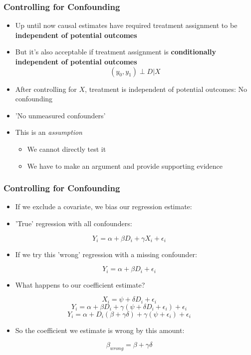 \documentclass[xcolor=x11names,compress]{beamer}\usepackage[]{graphicx}\usepackage[]{color}
\renewcommand{\(}{\begin{columns}}
\renewcommand{\)}{\end{columns}}
\newcommand{\<}[1]{\begin{column}{#1}}
\renewcommand{\>}{\end{column}}
\begin{document}
\begin{frame}
\frametitle{Controlling for Confounding}
\begin{itemize}
\item Up until now causal estimates have required treatment assignment to be \textbf{independent of potential outcomes}
\pause
\item But it's also acceptable if treatment assignment is \textbf{conditionally independent of potential outcomes}
\pause
$$(y_0,y_1) \perp D | X$$
\pause
\item After controlling for $X$, treatment is independent of potential outcomes: No confounding
\pause
\item 'No unmeasured confounders'
\pause
\item This is an \textit{assumption} 
\pause
\begin{itemize} 
\item We cannot directly test it
\pause
\item We have to make an argument and provide supporting evidence
\end{itemize}
\end{itemize}
\end{frame}

\begin{frame}
\frametitle{Controlling for Confounding}
\begin{itemize}
\item If we exclude a covariate, we bias our regression estimate:
\pause
\item 'True' regression with all confounders: 
\end{itemize}
$$ Y_i = \alpha + \beta D_i + \gamma X_i + \epsilon_i$$
\begin{itemize}
\pause
\item If we try this 'wrong' regression with a missing confounder:
\pause
\end{itemize}
$$ Y_i = \alpha + \beta D_i + \epsilon_i$$
\pause
\begin{itemize}
\item What happens to our coefficient estimate?
\pause
\end{itemize}
$$ X_i = \psi + \delta D_i + \epsilon_i$$
\pause
$$ Y_i = \alpha + \beta D_i + \gamma (\psi + \delta D_i + \epsilon_i) + \epsilon_i $$
\pause
$$ Y_i = \alpha + D_i (\beta + \gamma \delta) + \gamma (\psi  + \epsilon_i) + \epsilon_i $$
\pause
\begin{itemize}
\item So the coefficient we estimate is wrong by this amount:
\pause
\end{itemize}
$$ \beta_{wrong} = \beta + \gamma \delta$$
\end{frame}
\end{document}
